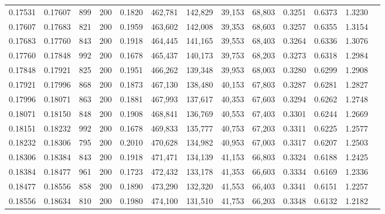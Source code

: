 \begin{tabular}{rrrrrrrrrrrrr}
0.17531 & 0.17607 &    899 & 200 &                                     0.1820 & 462,781 & 142,829 &  39,153 &  68,803 & 0.3251 & 0.6373 & 1.3230 \\
0.17607 & 0.17683 &    821 & 200 &                                     0.1959 & 463,602 & 142,008 &  39,353 &  68,603 & 0.3257 & 0.6355 & 1.3154 \\
0.17683 & 0.17760 &    843 & 200 &                                     0.1918 & 464,445 & 141,165 &  39,553 &  68,403 & 0.3264 & 0.6336 & 1.3076 \\
0.17760 & 0.17848 &    992 & 200 &                                     0.1678 & 465,437 & 140,173 &  39,753 &  68,203 & 0.3273 & 0.6318 & 1.2984 \\
0.17848 & 0.17921 &    825 & 200 &                                     0.1951 & 466,262 & 139,348 &  39,953 &  68,003 & 0.3280 & 0.6299 & 1.2908 \\
0.17921 & 0.17996 &    868 & 200 &                                     0.1873 & 467,130 & 138,480 &  40,153 &  67,803 & 0.3287 & 0.6281 & 1.2827 \\
0.17996 & 0.18071 &    863 & 200 &                                     0.1881 & 467,993 & 137,617 &  40,353 &  67,603 & 0.3294 & 0.6262 & 1.2748 \\
0.18071 & 0.18150 &    848 & 200 &                                     0.1908 & 468,841 & 136,769 &  40,553 &  67,403 & 0.3301 & 0.6244 & 1.2669 \\
0.18151 & 0.18232 &    992 & 200 &                                     0.1678 & 469,833 & 135,777 &  40,753 &  67,203 & 0.3311 & 0.6225 & 1.2577 \\
0.18232 & 0.18306 &    795 & 200 &                                     0.2010 & 470,628 & 134,982 &  40,953 &  67,003 & 0.3317 & 0.6207 & 1.2503 \\
0.18306 & 0.18384 &    843 & 200 &                                     0.1918 & 471,471 & 134,139 &  41,153 &  66,803 & 0.3324 & 0.6188 & 1.2425 \\
0.18384 & 0.18477 &    961 & 200 &                                     0.1723 & 472,432 & 133,178 &  41,353 &  66,603 & 0.3334 & 0.6169 & 1.2336 \\
0.18477 & 0.18556 &    858 & 200 &                                     0.1890 & 473,290 & 132,320 &  41,553 &  66,403 & 0.3341 & 0.6151 & 1.2257 \\
0.18556 & 0.18634 &    810 & 200 &                                     0.1980 & 474,100 & 131,510 &  41,753 &  66,203 & 0.3348 & 0.6132 & 1.2182 \\

\end{tabular}
